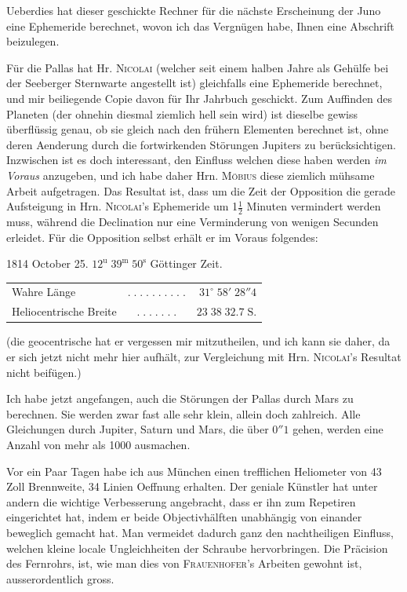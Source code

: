 \par\indent Ueberdies hat dieser geschickte Rechner für die nächste Erscheinung der Juno eine Ephemeride berechnet, wovon ich das Vergnügen habe, Ihnen eine Abschrift beizulegen.

\par\indent Für die Pallas hat Hr. \textsc{Nicolai} (welcher seit einem halben Jahre als Gehülfe bei der
Seeberger Sternwarte angestellt ist) gleichfalls eine Ephemeride berechnet, und mir beiliegende
Copie davon für Ihr Jahrbuch geschickt. Zum Auffinden des Planeten (der ohnehin diesmal ziemlich
hell sein wird) ist dieselbe gewiss überflüssig genau, ob sie gleich nach den frühern Elementen
berechnet ist, ohne deren Aenderung durch die fortwirkenden Störungen Jupiters zu berücksichtigen.
Inzwischen ist es doch interessant, den Einfluss welchen diese haben werden \emph{im Voraus}
anzugeben, und ich habe daher Hrn. \textsc{Möbius} diese ziemlich mühsame Arbeit aufgetragen. Das
Resultat ist, dass um die Zeit der Opposition die gerade Aufsteigung in Hrn. \textsc{Nicolai}'s
Ephemeride um 1$\frac{1}{2}$ Minuten vermindert werden muss, während die Declination nur eine
Verminderung von wenigen Secunden erleidet. Für die Opposition selbst erhält er im Voraus
folgendes:

\begin{center}1814 October 25. $12^{\mathrm u}\;39^{\mathrm m}\;50^{\mathrm s}$ Göttinger Zeit.\end{center}
\begin{center}\fontsize{10}{12}\selectfont\setlength{\tabcolsep}{2pt}\renewcommand{\arraystretch}{1.15}\begin{tabular}{lcr}
Wahre Länge & $.\;.\;.\;.\;.\;.\;.\;.\;.\;.$ & $31^\circ\;58'\;28''4$\\
Heliocentrische Breite & $.\;.\;.\;.\;.\;.\;.$ & $23\;38\;32.7\;\mathrm{S.}$\\
\end{tabular}\end{center}

\noindent (die geocentrische hat er vergessen mir mitzutheilen, und ich kann sie daher, da er sich jetzt
nicht mehr hier aufhält, zur Vergleichung mit Hrn. \textsc{Nicolai}'s Resultat nicht beifügen.)

\par\indent Ich habe jetzt angefangen, auch die Störungen der Pallas durch Mars zu berechnen. Sie werden
zwar fast alle sehr klein, allein doch zahlreich. Alle Gleichungen durch Jupiter, Saturn und
Mars, die über $0''1$ gehen, werden eine Anzahl von mehr als 1000 ausmachen.

\par\indent Vor ein Paar Tagen habe ich aus München einen trefflichen Heliometer von 43 Zoll Brennweite,
34 Linien Oeffnung erhalten. Der geniale Künstler hat unter andern die wichtige Verbesserung
angebracht, dass er ihn zum Repetiren eingerichtet hat, indem er beide Objectivhälften
unabhängig von einander beweglich gemacht hat. Man vermeidet dadurch ganz den nachtheiligen
Einfluss, welchen kleine locale Ungleichheiten der Schraube hervorbringen. Die Präcision des
Fernrohrs, ist, wie man dies von \textsc{Frauenhofer}'s Arbeiten gewohnt ist, ausserordentlich
gross.
